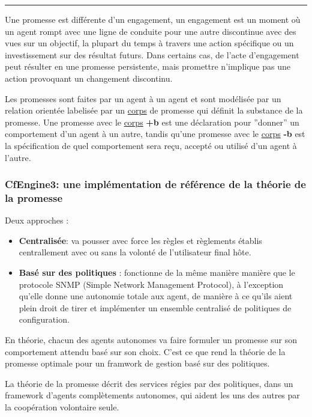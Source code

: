 \noindent\rule{8cm}{0.4pt}

Une promesse est différente d'un engagement, un engagement est un moment où un
agent rompt avec une ligne de conduite pour une autre discontinue avec des vues
sur un objectif, la plupart du temps à travers une action spécifique ou un
investissement sur des résultat futurs. Dans certains cas, de l'acte
d'engagement peut résulter en une promesse persistente, mais promettre
n'implique pas une action provoquant un changement discontinu.

Les promesses sont faites par un agent à un agent et sont modélisée par un
relation orientée labelisée par un \underline{corps} de promesse qui définit la
substance de la promesse. Une promesse avec le \underline{corps} \textbf{+b} est 
une déclaration pour ''donner'' un comportement d'un agent à un autre, tandis
qu'une promesse avec le \underline{corps} \textbf{-b} est la spécification de
quel comportement sera reçu, accepté ou utilisé d'un agent à l'autre.

\subsubsection{CfEngine3: une implémentation de référence de la théorie de la
promesse}

Deux approches :

\begin{itemize}
  \item \textbf{Centralisée}: 
  	va pousser avec force les règles et règlements établis centrallement
  	avec ou sans la volonté de l'utilisateur final hôte.
  \item \textbf{Basé sur des politiques} :
  	fonctionne de la même manière manière que le protocole SNMP (Simple
  	Network Management Protocol), à l'exception qu'elle donne une autonomie
  	totale aux agent, de manière à ce qu'ils aient plein droit de tirer et
  	implémenter un ensemble centralisé de politiques de configuration.
\end{itemize}

En théorie, chacun des agents autonomes va faire formuler un promesse sur son
comportement attendu basé sur son choix. C'est ce que rend la théorie de la
promesse optimale pour un framwork de gestion basé sur des politiques.

La théorie de la promesse décrit des services régies par des politiques, dans un
framework d'agents complètements autonomes, qui aident les uns des autres par la
coopération volontaire seule.

